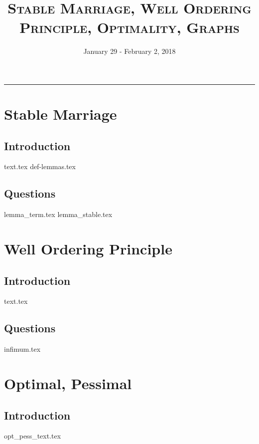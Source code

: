 \documentclass{exam}
\title{\textsc{Stable Marriage, Well Ordering Principle, Optimality, Graphs}}
\date{January 29 - February 2, 2018}
\begin{document}
\maketitle
\rule{\textwidth}{0.15em}
\fontsize{12}{15}\selectfont
\thispagestyle{empty}


\section{Stable Marriage}
\subsection{Introduction}
{text.tex}
{def-lemmas.tex}
\subsection{Questions}
\begin{questions}
{lemma_term.tex}
{lemma_stable.tex}
\end{questions}

\section{Well Ordering Principle}
\subsection{Introduction}
{text.tex}
\subsection{Questions}
\begin{questions}
{infimum.tex}
\end{questions}

\section{Optimal, Pessimal}
\subsection{Introduction}
{opt_pess_text.tex}
\end{document}
